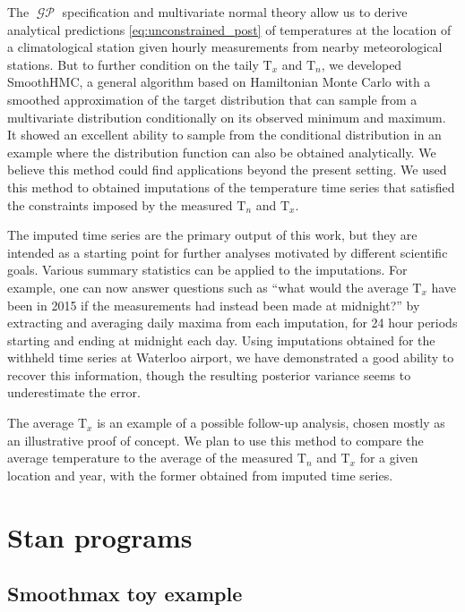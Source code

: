 \documentclass[letter]{article}
\DeclareMathOperator{\GP}{\mathcal{GP}}
\newcommand{\T}{\mathrm{T}}
\newcommand{\Tn}{\T_{n}}
\newcommand{\Tx}{\T_{x}}
\begin{document}
The \(\GP\) specification and multivariate normal theory allow us to derive analytical predictions \eqref{eq:unconstrained_post} of temperatures at the location of a climatological station given hourly measurements from nearby meteorological stations.
But to further condition on the taily \(\Tx\) and \(\Tn\), we developed SmoothHMC, a general algorithm based on Hamiltonian Monte Carlo with a smoothed approximation of the target distribution that can sample from a multivariate distribution conditionally on its observed minimum and maximum.
It showed an excellent ability to sample from the conditional distribution in an example where the distribution function can also be obtained analytically.
We believe this method could find applications beyond the present setting.
We used this method to obtained imputations of the temperature time series that satisfied the constraints imposed by the measured \(\Tn\) and \(\Tx\).
    


        The imputed time series are the primary output of this work, but they are intended as a starting point for further analyses motivated by different scientific goals.
Various summary statistics can be applied to the imputations.
For example, one can now answer questions such as ``what would the average \(\Tx\) have been in 2015 if the measurements had instead been made at midnight?'' by extracting and averaging daily maxima from each imputation, for 24 hour periods starting and ending at midnight each day.
Using imputations obtained for the withheld time series at Waterloo airport, we have demonstrated a good ability to recover this information, though the resulting posterior variance seems to underestimate the error.

The average \(\Tx\) is an example of a possible follow-up analysis, chosen mostly as an illustrative proof of concept.
We plan to use this method to compare the average temperature to the average of the measured \(\Tn\) and \(\Tx\) for a given location and year, with the former obtained from imputed time series.
    

\appendix
        \section{Stan programs}\label{stan-programs}

\subsection{Smoothmax toy example}\label{smoothmax-toy-example}
    
\end{document}
